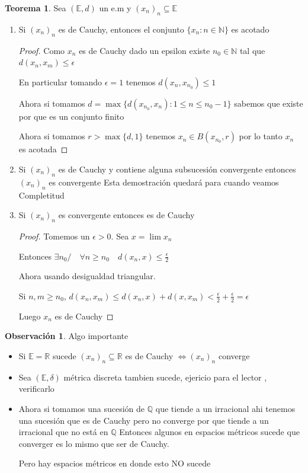 \documentclass[12pt]{article}
\newcommand{\Q}{\mathbb{Q}}
\newcommand{\R}{\mathbb{R}}
\newcommand{\E}{\mathbb{E}}
\newcommand{\N}{\mathbb{N}}
\theoremstyle{definition}
\newtheorem*{remark}{Observación}
\newtheorem{theorem}{Teorema}
\begin{document}
\begin{theorem}
  Sea $(\E,d)$ un e.m y $(x_{n})_{n} \subseteq \E$
  \begin{enumerate}
    \item Si  $(x_{n})_{n}$ es de Cauchy, entonces el conjunto $\{x_{n} : n \in \N\}$ es acotado
      \begin{proof}
	Como $x_{n}$ es de Cauchy dado un epsilon existe $n_{0} \in \N$ tal que $d(x_{n},x_{m}) \leq \epsilon$

	En particular tomando $\epsilon = 1$  tenemos $d(x_{n}, x_{n_{0}}) \leq 1$

	Ahora si tomamos $d = \max{ \{ d(x_{n_{0}},x_{n}): 1 \leq n \leq n_{0} - 1\}}$ sabemos que existe por que es un conjunto finito 

	Ahora si tomamos $r > \max{\{d,1\}}$ tenemos $x_{n} \in B(x_{n_{0}},r)$ por lo tanto $x_{n}$ es acotada
      \end{proof}

    \item Si  $(x_{n})_{n}$ es de Cauchy y contiene alguna subsucesión convergente entonces  $(x_{n})_{n}$ es convergente
Esta demostración quedará para cuando veamos Completitud

\newpage
    \item Si  $(x_{n})_{n}$ es convergente entonces es de Cauchy 
      \begin{proof}
	Tomemos un $\epsilon > 0$. Sea $x = \lim{x_{n}}$ 

	Entonces $\exists n_{0} / \quad \forall n \geq n_{0} \quad d(x_{n},x) \leq \frac{\epsilon}{2}$

	Ahora usando desigualdad triangular. 

	Si $n,m \geq n_{0}$, $d(x_{n},x_{m}) \leq d(x_{n}, x ) + d(x,x_{m}) < \frac{\epsilon}{2} + \frac{\epsilon}{2} = \epsilon$

	Luego $x_{n}$ es de Cauchy
      \end{proof}
      
  \end{enumerate}
\end{theorem}

\begin{remark} Algo importante 

  \begin{itemize} 
    \item Si $\E = \R$ sucede $(x_{n})_{n} \subseteq \R$ es de Cauchy $\iff (x_{n})_{n}$ converge 
    \item Sea $(\E,\delta)$ métrica discreta tambien sucede, ejericio para el lector , verificarlo
    \item Ahora si tomamos una sucesión de $\Q$ que tiende a un irracional ahi tenemos una sucesión que es de Cauchy pero no converge por que tiende a un irracional que no está en $\Q$
      Entonces algunos en espacios métricos sucede que converger es lo mismo que ser de Cauchy.

      Pero hay espacios métricos en donde esto NO sucede
    \end{itemize}
\end{remark}
\end{document}
